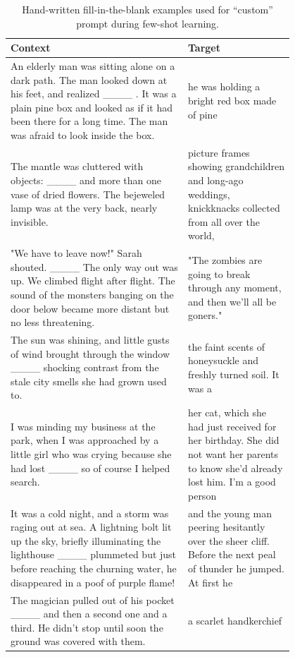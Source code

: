 \begin{table}
    \centering
    \small
    \begin{tabular}{|p{0.5\linewidth}|p{0.3\linewidth}|}
         \midrule
         \textbf{Context} & \textbf{Target} \\
         \midrule
An elderly man was sitting alone on a dark path. The man looked down at his feet, and realized \_\_\_\_ . It was a plain pine box and looked as if it had been there for a long time. The man was afraid to look inside the box. & he was holding a bright red box made of pine \\
\arrayrulecolor{lg} \midrule \arrayrulecolor{black}
The mantle was cluttered with objects: \_\_\_\_ and more than one vase of dried flowers. The bejeweled lamp was at the very back, nearly invisible. & picture frames showing grandchildren and long-ago weddings, knickknacks collected from all over the world, \\
\arrayrulecolor{lg} \midrule \arrayrulecolor{black}
"We have to leave now!" Sarah shouted. \_\_\_\_ The only way out was up. We climbed flight after flight. The sound of the monsters banging on the door below became more distant but no less threatening. & "The zombies are going to break through any moment, and then we'll all be goners." \\
\arrayrulecolor{lg} \midrule \arrayrulecolor{black}
The sun was shining, and little gusts of wind brought through the window \_\_\_\_ shocking contrast from the stale city smells she had grown used to. & the faint scents of honeysuckle and freshly turned soil. It was a \\
\arrayrulecolor{lg} \midrule \arrayrulecolor{black}
I was minding my business at the park, when I was approached by a little girl who was crying because she had lost \_\_\_\_ so of course I helped search. & her cat, which she had just received for her birthday. She did not want her parents to know she'd already lost him. I'm a good person \\
\arrayrulecolor{lg} \midrule \arrayrulecolor{black}
It was a cold night, and a storm was raging out at sea. A lightning bolt lit up the sky, briefly illuminating the lighthouse \_\_\_\_ plummeted but just before reaching the churning water, he disappeared in a poof of purple flame! & and the young man peering hesitantly over the sheer cliff. Before the next peal of thunder he jumped. At first he  \\
\arrayrulecolor{lg} \midrule \arrayrulecolor{black}
The magician pulled out of his pocket \_\_\_\_ and then a second one and a third. He didn't stop until soon the ground was covered with them. & a scarlet handkerchief  \\
         \midrule
    \end{tabular}
    \caption{Hand-written fill-in-the-blank examples used for ``custom'' prompt during few-shot learning.}
    \label{tab:custom_examples}
\end{table}



